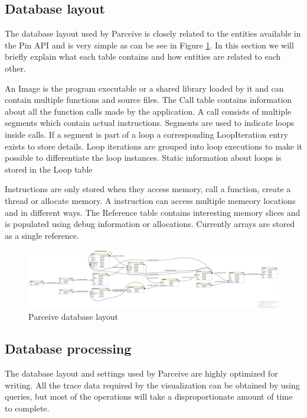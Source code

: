 \subsection{Database layout}

The database layout used by Parceive is closely related to the entities available in the Pin API and is very simple as can be see in Figure \ref{parceive:layout}. In this section we will briefly explain what each table contains and how entities are related to each other.

An Image is the program executable or a shared library loaded by it and can contain multiple functions and source files. The Call table contains information about all the function calls made by the application. A call consists of multiple segments which contain actual instructions. Segments are used to indicate loops inside calls. If a segment is part of a loop a corresponding LoopIteration entry exists to store details. Loop iterations are grouped into loop executions to make it possible to differentiate the loop instances. Static information about loops is stored in the Loop table

Instructions are only stored when they access memory, call a function, create a thread or allocate memory. A instruction can access multiple memeory locations and in different ways. The Reference table contains interesting memory slices and is populated using debug information or allocations. Currently arrays are stored as a single reference.

\begin{figure}
	\centering
	\includegraphics[width=1\textwidth]{parceive-schema}
	\caption{Parceive database layout}
	\label{parceive:layout}
\end{figure}

\subsection{Database processing}
\label{dataprocessing}

The database layout and settings used by Parceive are highly optimized for writing. All the trace data required by the visualization can be obtained by using queries, but most of the operations will take a disproportionate amount of time to complete.

